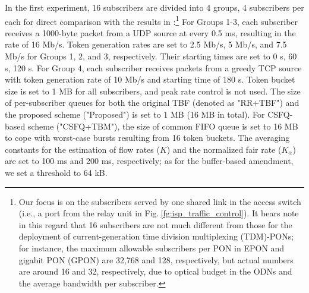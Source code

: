 \documentclass[conference,twoside,final]{IEEEtran}
\begin{document}
In the first experiment, 16 subscribers are divided into 4 groups, 4 subscribers
per each for direct comparison with the results in \cite{Kim:14-1}:\footnote{Our focus is on the subscribers served by one shared link in the access
switch (i.e., a port from the relay unit in
Fig.\(~\)\ref{fg:isp_traffic_control}). It bears note in this regard that 16
subscribers are not much different from those for the deployment of
current-generation time division multiplexing (TDM)-PONs; for instance, the
maximum allowable subscribers per PON in EPON and gigabit PON (GPON) are 32,768
and 128, respectively, but actual numbers are around 16 and 32, respectively,
due to optical budget in the ODNs and the average bandwidth per subscriber.} For
Groups 1-3, each subscriber receives a 1000-byte packet from a UDP source at
every 0.5 ms, resulting in the rate of 16 Mb/s. Token generation rates are set
to 2.5 Mb/s, 5 Mb/s, and 7.5 Mb/s for Groups 1, 2, and 3, respectively. Their
starting times are set to 0 s, 60 s, 120 s. For Group 4, each subscriber
receives packets from a greedy TCP source with token generation rate of 10 Mb/s
and starting time of 180 s. Token bucket size is set to 1 MB for all
subscribers, and peak rate control is not used. The size of per-subscriber
queues for both the original TBF (denoted as "RR+TBF") and the proposed scheme
("Proposed") is set to 1 MB (16 MB in total). For CSFQ-based scheme
("CSFQ+TBM"), the size of common FIFO queue is set to 16 MB to cope with
worst-case bursts resulting from 16 token buckets. The averaging constants for
the estimation of flow rates (\(K\)) and the normalized fair rate
(\(K_{\alpha}\)) are set to 100 ms and 200 ms, respectively; as for the
buffer-based amendment, we set a threshold to 64 kB.
\end{document}
